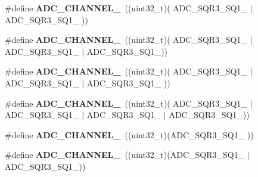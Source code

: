 \begin{DoxyCompactItemize}
\mbox{\label{group___a_d_c__channels_gad5ff4f4f0e5f6f9ffbdfb6f4cbc3a6e0}} 
\#define {\bfseries A\+D\+C\+\_\+\+C\+H\+A\+N\+N\+E\+L\+\_}~((uint32\+\_\+t)(                 A\+D\+C\+\_\+\+S\+Q\+R3\+\_\+\+S\+Q1\+\_ $\vert$ A\+D\+C\+\_\+\+S\+Q\+R3\+\_\+\+S\+Q1\+\_                                  ))
\item 
\mbox{\label{group___a_d_c__channels_gad7550270d90a1a12b00cd9f8ad9f1fc2}} 
\#define {\bfseries A\+D\+C\+\_\+\+C\+H\+A\+N\+N\+E\+L\+\_}~((uint32\+\_\+t)(                 A\+D\+C\+\_\+\+S\+Q\+R3\+\_\+\+S\+Q1\+\_ $\vert$ A\+D\+C\+\_\+\+S\+Q\+R3\+\_\+\+S\+Q1\+\_                  $\vert$ A\+D\+C\+\_\+\+S\+Q\+R3\+\_\+\+S\+Q1\+\_))
\item 
\mbox{\label{group___a_d_c__channels_ga9caff32bcda5dd83f662bf398ab14d36}} 
\#define {\bfseries A\+D\+C\+\_\+\+C\+H\+A\+N\+N\+E\+L\+\_}~((uint32\+\_\+t)(                 A\+D\+C\+\_\+\+S\+Q\+R3\+\_\+\+S\+Q1\+\_ $\vert$ A\+D\+C\+\_\+\+S\+Q\+R3\+\_\+\+S\+Q1\+\_ $\vert$ A\+D\+C\+\_\+\+S\+Q\+R3\+\_\+\+S\+Q1\+\_                 ))
\item 
\mbox{\label{group___a_d_c__channels_ga66f41aad197a6de160dd8958c90653a2}} 
\#define {\bfseries A\+D\+C\+\_\+\+C\+H\+A\+N\+N\+E\+L\+\_}~((uint32\+\_\+t)(                 A\+D\+C\+\_\+\+S\+Q\+R3\+\_\+\+S\+Q1\+\_ $\vert$ A\+D\+C\+\_\+\+S\+Q\+R3\+\_\+\+S\+Q1\+\_ $\vert$ A\+D\+C\+\_\+\+S\+Q\+R3\+\_\+\+S\+Q1\+\_ $\vert$ A\+D\+C\+\_\+\+S\+Q\+R3\+\_\+\+S\+Q1\+\_))
\item 
\mbox{\label{group___a_d_c__channels_ga7892590f524e7356deb1e513bbc0cdaf}} 
\#define {\bfseries A\+D\+C\+\_\+\+C\+H\+A\+N\+N\+E\+L\+\_}~((uint32\+\_\+t)(A\+D\+C\+\_\+\+S\+Q\+R3\+\_\+\+S\+Q1\+\_                                                                    ))
\item 
\mbox{\label{group___a_d_c__channels_gaf7760a480f79c62d19260291f8afb6e1}} 
\#define {\bfseries A\+D\+C\+\_\+\+C\+H\+A\+N\+N\+E\+L\+\_}~((uint32\+\_\+t)(A\+D\+C\+\_\+\+S\+Q\+R3\+\_\+\+S\+Q1\+\_                                                    $\vert$ A\+D\+C\+\_\+\+S\+Q\+R3\+\_\+\+S\+Q1\+\_))

\end{DoxyCompactItemize}
